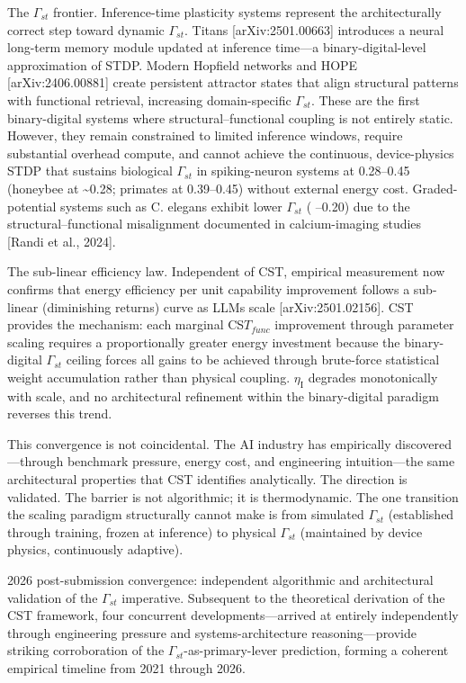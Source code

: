 \documentclass[a4paper,12pt]{article}
\begin{document}
The $\Gamma_{st}$ frontier.
Inference-time plasticity systems represent the architecturally correct step toward dynamic $\Gamma_{st}$.
Titans [arXiv:2501.00663] introduces a neural long-term memory module updated at inference time---a binary-digital-level approximation of STDP.
Modern Hopfield networks and HOPE [arXiv:2406.00881] create persistent attractor states that align structural patterns with functional retrieval, increasing domain-specific $\Gamma_{st}$.
These are the first binary-digital systems where structural--functional coupling is not entirely static.
However, they remain constrained to limited inference windows, require substantial overhead compute, and cannot achieve the continuous, device-physics STDP that sustains biological $\Gamma_{st}$ in spiking-neuron systems at 0.28--0.45 (honeybee at \textasciitilde{}0.28; primates at 0.39--0.45) without external energy cost.
Graded-potential systems such as C. elegans exhibit lower $\Gamma_{st}$ ( --0.20) due to the structural--functional misalignment documented in calcium-imaging studies [Randi et al., 2024].

The sub-linear efficiency law.
Independent of CST, empirical measurement now confirms that energy efficiency per unit capability improvement follows a sub-linear (diminishing returns) curve as LLMs scale [arXiv:2501.02156].
CST provides the mechanism: each marginal CS$T_{func}$ improvement through parameter scaling requires a proportionally greater energy investment because the binary-digital $\Gamma_{st}$ ceiling forces all gains to be achieved through brute-force statistical weight accumulation rather than physical coupling. $\eta_{\text{I}}$ degrades monotonically with scale, and no architectural refinement within the binary-digital paradigm reverses this trend.

This convergence is not coincidental.
The AI industry has empirically discovered---through benchmark pressure, energy cost, and engineering intuition---the same architectural properties that CST identifies analytically.
The direction is validated.
The barrier is not algorithmic; it is thermodynamic.
The one transition the scaling paradigm structurally cannot make is from simulated $\Gamma_{st}$ (established through training, frozen at inference) to physical $\Gamma_{st}$ (maintained by device physics, continuously adaptive).

2026 post-submission convergence: independent algorithmic and architectural validation of the $\Gamma_{st}$ imperative. Subsequent to the theoretical derivation of the CST framework, four concurrent developments---arrived at entirely independently through engineering pressure and systems-architecture reasoning---provide striking corroboration of the $\Gamma_{st}$-as-primary-lever prediction, forming a coherent empirical timeline from 2021 through 2026.
\end{document}
